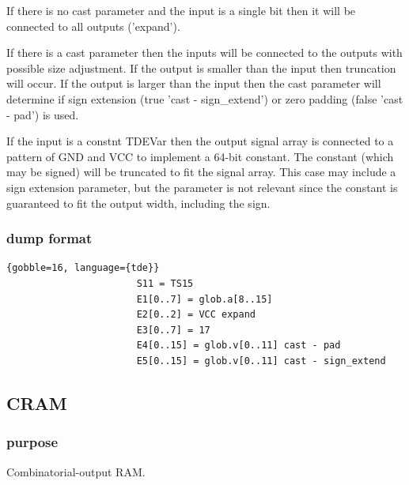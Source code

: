                 If there is no cast parameter and the input is a single bit
                then it will be connected to all outputs ('expand').

                If there is a cast parameter then the inputs will be connected
                to the outputs with possible size adjustment. If the output is
                smaller than the input then truncation will occur. If the
                output is larger than the input then the cast parameter will
                determine if sign extension (true 'cast - sign\_extend') or zero
                padding (false 'cast - pad') is used.
                
                If the input is a constnt TDEVar then the output signal array
                is connected to a pattern of GND and VCC to implement a 64-bit
                constant. The constant (which may be signed) will be truncated
                to fit the signal array. This case may include a sign extension
                parameter, but the parameter is not relevant since the constant
                is guaranteed to fit the output width, including the sign.

            \subsubsection{dump format}
            
                \begin{lstlisting}{gobble=16, language={tde}}
                       S11 = TS15
                       E1[0..7] = glob.a[8..15]
                       E2[0..2] = VCC expand
                       E3[0..7] = 17
                       E4[0..15] = glob.v[0..11] cast - pad
                       E5[0..15] = glob.v[0..11] cast - sign_extend
                \end{lstlisting}
                





        \subsection{CRAM}

            \subsubsection{purpose}
            
                Combinatorial-output RAM.

